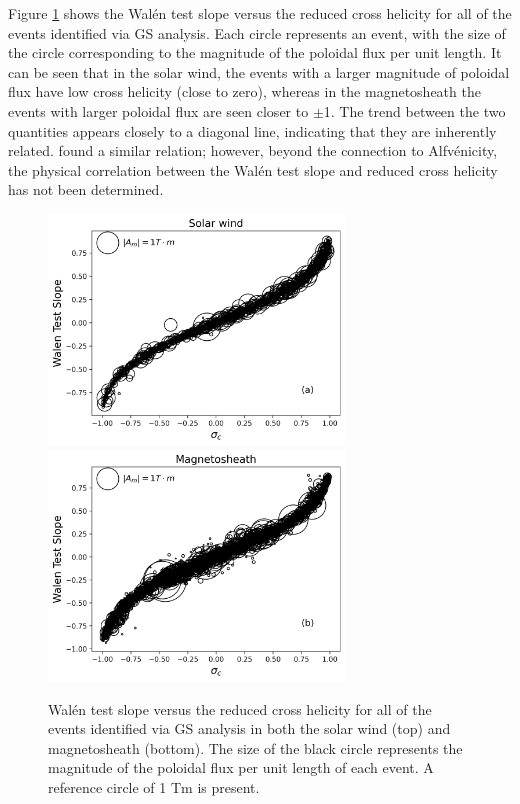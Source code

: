 Figure \ref{fig:walen-crosshelicity} shows the Wal\'en test slope versus the reduced cross helicity for all of the events identified via GS analysis. Each circle represents an event, with the size of the circle corresponding to the magnitude of the poloidal flux per unit length. It can be seen that in the solar wind, the events with a larger magnitude of poloidal flux have low cross helicity (close to zero), whereas in the magnetosheath the events with larger poloidal flux are seen closer to $\pm$1. The trend between the two quantities appears closely to a diagonal line, indicating that they are inherently related. \cite{Chen:2022} found a similar relation; however, beyond the connection to Alfv\'enicity, the physical correlation between the Wal\'en test slope and reduced cross helicity has not been determined.

\begin{figure}
    \centering
    \includegraphics[width=0.7\textwidth]{Figures/GS analysis/walenTest_vs_crosshelicity_solarwind.png}
    \includegraphics[width=0.7\textwidth]{Figures/GS analysis/walenTest_vs_crosshelicity_magnetosheath.png}
    \caption[Wal\'en test slope vs. reduced cross helicity]{Wal\'en test slope versus the reduced cross helicity for all of the events identified via GS analysis in both the solar wind (top) and magnetosheath (bottom). The size of the black circle represents the magnitude of the poloidal flux per unit length of each event. A reference circle of 1 Tm is present.}
    \label{fig:walen-crosshelicity}
\end{figure}

